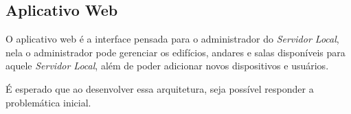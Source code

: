 \subsection{Aplicativo Web}
O aplicativo web é a interface pensada para o administrador do \emph{Servidor Local}, nela o administrador pode
gerenciar os edifícios, andares e salas disponíveis para aquele \emph{Servidor Local}, além de poder adicionar 
novos dispositivos e usuários.

É esperado que ao desenvolver essa arquitetura, seja possível responder a problemática inicial.